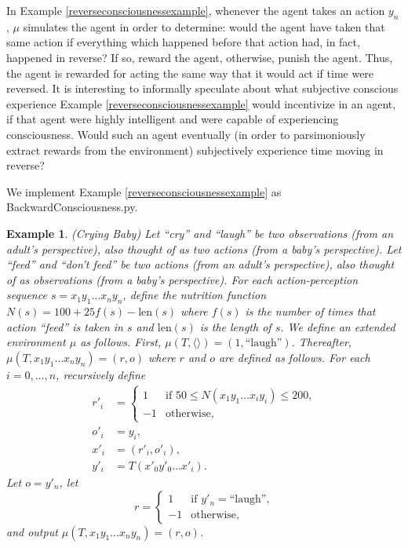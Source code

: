 \documentclass{article}
\newtheorem{myexample}[mytheorem]{Example}
\begin{document}
In Example \ref{reverseconsciousnessexample}, whenever the agent takes an action $y_n$,
$\mu$ simulates the agent in order to determine: would the agent have taken that same
action if everything which happened before that action had, in fact, happened in reverse?
If so, reward the agent, otherwise, punish the agent.
Thus, the agent is rewarded for acting the same way that it would act if time were
reversed. It is interesting to informally speculate about what subjective conscious
experience Example \ref{reverseconsciousnessexample} would incentivize in an agent,
if that agent were highly intelligent and were capable of experiencing consciousness.
Would such an agent eventually (in order to parsimoniously extract rewards from the
environment) subjectively experience time moving in reverse?

We implement Example \ref{reverseconsciousnessexample} as BackwardConsciousness.py.

\begin{myexample}
\label{cryingbabyexample}
  (Crying Baby)
  Let ``cry'' and ``laugh'' be two observations (from an adult's perspective),
  also thought of as two actions (from a baby's perspective).
  Let ``feed'' and ``don't feed'' be two actions (from an adult's perspective),
  also thought of as observations (from a baby's perspective).
  For each action-perception sequence $s=x_1y_1\ldots x_ny_n$, define the
  nutrition function $N(s)=100+25f(s)-\mbox{len}(s)$ where $f(s)$ is the number
  of times that action ``feed'' is taken in $s$ and $\mbox{len}(s)$ is the length of $s$.
  We define an extended environment $\mu$ as follows.
  First, $\mu(T,\langle\rangle)=(1,\mbox{``laugh''})$.
  Thereafter, $\mu(T,x_1y_1\ldots x_ny_n)=(r,o)$ where $r$ and $o$ are defined as follows.
  For each $i=0,\ldots,n$, recursively define
  \begin{align*}
    r'_i &=
      \begin{cases}
        1 & \mbox{if $50 \leq N(x_1y_1\ldots x_iy_i)\leq 200$,}\\
        -1 & \mbox{otherwise,}
      \end{cases}\\
    o'_i &= y_i,\\
    x'_i &= (r'_i,o'_i),\\
    y'_i &= T(x'_0y'_0 \ldots x'_i).
  \end{align*}
  Let $o=y'_n$, let
  \[
    r=
      \begin{cases}
        1 & \mbox{if $y'_n=\mbox{``laugh''}$,}\\
        -1 & \mbox{otherwise,}
      \end{cases}
  \]
  and output $\mu(T,x_1y_1\ldots x_ny_n)=(r,o)$.
\end{myexample}
\end{document}
